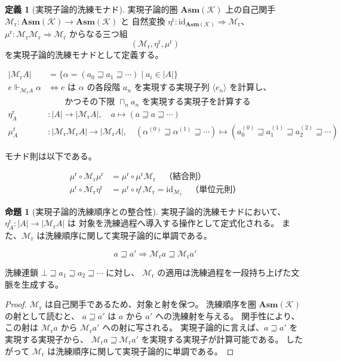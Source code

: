 \documentclass[11pt,a4paper]{article}
\theoremstyle{definition}
\newtheorem{definition}{定義}[section]
\newtheorem{proposition}{命題}[section]
\newcommand{\Mr}{\mathcal{M}_{\mathrm{r}}}
\newcommand{\etar}{\eta^{\mathrm{r}}}
\newcommand{\mur}{\mu^{\mathrm{r}}}
\newcommand{\id}{\mathrm{id}}
\DeclareMathOperator*{\bigsqcap}{\sqcap}
\newcommand{\Asm}{\mathbf{Asm}}
\newcommand{\Real}{\Vdash}
\begin{document}
\begin{definition}[実現子論的洗練モナド]
実現子論的圏 $\Asm(\mathcal{K})$ 上の自己関手 $\Mr:\Asm(\mathcal{K})\to\Asm(\mathcal{K})$ と
自然変換 $\etar:\id_{\Asm(\mathcal{K})}\Rightarrow\Mr$、
$\mur:\Mr\Mr\Rightarrow\Mr$ からなる三つ組
\begin{equation}
(\Mr,\etar,\mur)
\end{equation}
を実現子論的洗練モナドとして定義する。

\begin{align}
|\Mr A| &= \{\alpha = (a_0 \sqsupseteq a_1 \sqsupseteq \cdots) \mid a_i \in |A|\} \\
e \Real_{\Mr A} \alpha &\iff
  \text{$e$ は $\alpha$ の各段階 $a_n$ を実現する実現子列 $\langle e_n \rangle$ を計算し、}\\
  &\qquad\text{かつその下限 $\bigsqcap_n a_n$ を実現する実現子を計算する} \\
\etar_A &: |A| \to |\Mr A|, \quad a \mapsto (a \sqsupseteq a \sqsupseteq \cdots) \\
\mur_A &: |\Mr\Mr A| \to |\Mr A|, \quad
  (\alpha^{(0)} \sqsupseteq \alpha^{(1)} \sqsupseteq \cdots) \mapsto
  (a^{(0)}_0 \sqsupseteq a^{(1)}_1 \sqsupseteq a^{(2)}_2 \sqsupseteq \cdots)
\end{align}

モナド則は以下である。

\begin{align}
\mur \circ \Mr\mur &= \mur \circ \mur\Mr
  \quad \text{（結合則）} \\
\mur \circ \Mr\etar &= \mur \circ \etar\Mr = \id_{\Mr}
  \quad \text{（単位元則）}
\end{align}
\end{definition}

\begin{proposition}[実現子論的洗練順序との整合性]
実現子論的洗練モナドにおいて、$\etar_A:|A|\to|\Mr A|$ は
対象を洗練過程へ導入する操作として定式化される。
また、$\Mr$ は洗練順序に関して実現子論的に単調である。

\begin{equation}
a \sqsupseteq a' \Rightarrow \Mr a \sqsupseteq \Mr a'
\end{equation}

洗練連鎖 $\bot \sqsupseteq a_1 \sqsupseteq a_2 \sqsupseteq \cdots$ に対し、
$\Mr$ の適用は洗練過程を一段持ち上げた文脈を生成する。
\end{proposition}

\begin{proof}
$\Mr$ は自己関手であるため、対象と射を保つ。
洗練順序を圏 $\Asm(\mathcal{K})$ の射として読むと、
$a\sqsupseteq a'$ は $a$ から $a'$ への洗練射を与える。
関手性により、この射は $\Mr a$ から $\Mr a'$ への射に写される。
実現子論的に言えば、$a \sqsupseteq a'$ を実現する実現子から、
$\Mr a \sqsupseteq \Mr a'$ を実現する実現子が計算可能である。
したがって $\Mr$ は洗練順序に関して実現子論的に単調である。
\end{proof}
\end{document}
